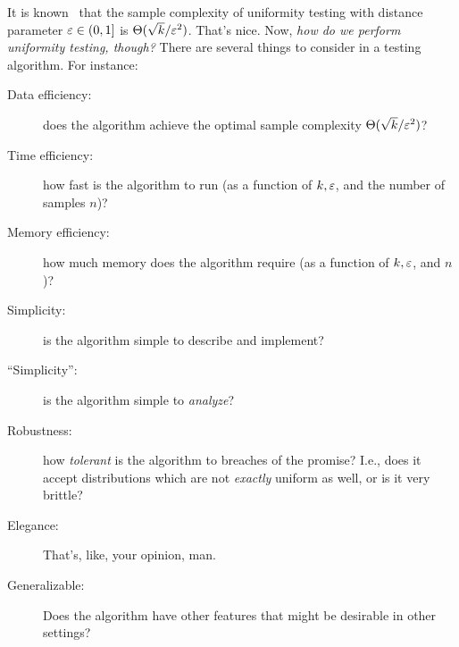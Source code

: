 \documentclass[10pt]{article}
\newcommand{\dst}{\eps}
\newcommand{\ab}{k}
\newcommand{\ns}{n}
\begin{document}
It is known~\cite{Paninski08} that the sample complexity of uniformity testing with distance parameter $\dst\in(0,1]$ is $\Theta(\sqrt{\ab}/\dst^2)$. That's nice. Now, \emph{how do we perform uniformity testing, though?} 
There are several things to consider in a testing algorithm. For instance:
\begin{description}
  \item[Data efficiency:] does the algorithm achieve the optimal sample complexity $\Theta(\sqrt{\ab}/\dst^2)$?
  \item[Time efficiency:] how fast is the algorithm to run (as a function of $\ab,\dst$, and the number of samples $\ns$)?
  \item[Memory efficiency:] how much memory does the algorithm require (as a function of $\ab,\dst$, and $\ns$)?
  \item[Simplicity:] is the algorithm simple to describe and implement?
  \item[``Simplicity'':] is the algorithm simple to \emph{analyze}?
  \item[Robustness:] how \emph{tolerant} is the algorithm to breaches of the promise? I.e., does it accept distributions which are not \emph{exactly} uniform as well, or is it very brittle?
  \item[Elegance:] That's, like, your opinion, man.
  \item[Generalizable:] Does the algorithm have other features that might be desirable in other settings?
\end{description}
\end{document}
